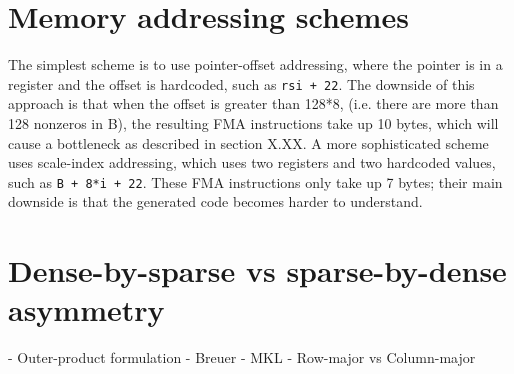 \section{Memory addressing schemes}

The simplest scheme is to use pointer-offset addressing, where the pointer is in a register and the offset is hardcoded, such as \texttt{rsi + 22}. The downside of this approach is that when the offset is greater than 128*8, (i.e. there are more than 128 nonzeros in B), the resulting FMA instructions take up 10 bytes, which will cause a bottleneck as described in section X.XX. A more sophisticated scheme uses scale-index addressing, which uses two registers and two hardcoded values, such as \texttt{B + 8*i + 22}. These FMA instructions only take up 7 bytes; their main downside is that the generated code becomes harder to understand.




\section{Dense-by-sparse vs sparse-by-dense asymmetry}

- Outer-product formulation
- Breuer
- MKL
- Row-major vs Column-major

